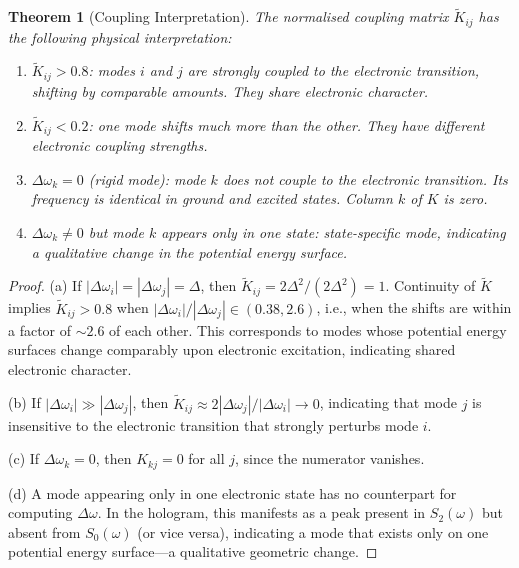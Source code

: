 \documentclass[11pt,twocolumn,a4paper]{article}
\newtheorem{theorem}{Theorem}[section]
\theoremstyle{definition}
\theoremstyle{remark}
\begin{document}
\begin{theorem}[Coupling Interpretation]
\label{thm:coupling_interp}
The normalised coupling matrix $\tilde{K}_{ij}$ has the following physical interpretation:
\begin{enumerate}[label=(\alph*)]
  \item $\tilde{K}_{ij} > 0.8$: modes $i$ and $j$ are strongly coupled to the electronic transition, shifting by comparable amounts. They share electronic character.
  \item $\tilde{K}_{ij} < 0.2$: one mode shifts much more than the other. They have different electronic coupling strengths.
  \item $\Delta\omega_k = 0$ (rigid mode): mode $k$ does not couple to the electronic transition. Its frequency is identical in ground and excited states. Column $k$ of $K$ is zero.
  \item $\Delta\omega_k \neq 0$ but mode $k$ appears only in one state: state-specific mode, indicating a qualitative change in the potential energy surface.
\end{enumerate}
\end{theorem}

\begin{proof}
(a) If $|\Delta\omega_i| = |\Delta\omega_j| = \Delta$, then $\tilde{K}_{ij} = 2\Delta^2/(2\Delta^2) = 1$. Continuity of $\tilde{K}$ implies $\tilde{K}_{ij} > 0.8$ when $|\Delta\omega_i|/|\Delta\omega_j| \in (0.38, 2.6)$, i.e., when the shifts are within a factor of $\sim 2.6$ of each other. This corresponds to modes whose potential energy surfaces change comparably upon electronic excitation, indicating shared electronic character.

(b) If $|\Delta\omega_i| \gg |\Delta\omega_j|$, then $\tilde{K}_{ij} \approx 2|\Delta\omega_j|/|\Delta\omega_i| \to 0$, indicating that mode $j$ is insensitive to the electronic transition that strongly perturbs mode $i$.

(c) If $\Delta\omega_k = 0$, then $K_{kj} = 0$ for all $j$, since the numerator vanishes.

(d) A mode appearing only in one electronic state has no counterpart for computing $\Delta\omega$. In the hologram, this manifests as a peak present in $S_2(\omega)$ but absent from $S_0(\omega)$ (or vice versa), indicating a mode that exists only on one potential energy surface---a qualitative geometric change.
\end{proof}
\end{document}
